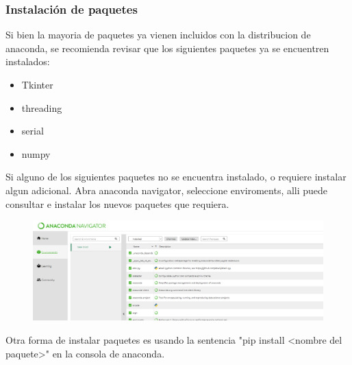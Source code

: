 \documentclass[letterpaper,12pt]{article}
\begin{document}
	\subsubsection{Instalación de paquetes}
	Si bien la mayoria de paquetes ya vienen incluidos con la distribucion de anaconda, se recomienda revisar que los siguientes paquetes ya se encuentren instalados:
	\begin{itemize}
		\item Tkinter
		\item threading
		\item serial
		\item numpy
	\end{itemize}
	Si alguno de los siguientes paquetes no se encuentra instalado, o requiere instalar algun adicional. Abra anaconda navigator, seleccione enviroments, alli puede consultar e instalar los nuevos paquetes que requiera.
	\begin{figure}[H]
		\centering
		\includegraphics[width=0.7\linewidth]{images/anaconda6}
	
		\label{fig:anaconda6}
	\end{figure}
	Otra forma de instalar paquetes es usando la sentencia "pip install <nombre del paquete>" en la consola de anaconda.
\end{document}
